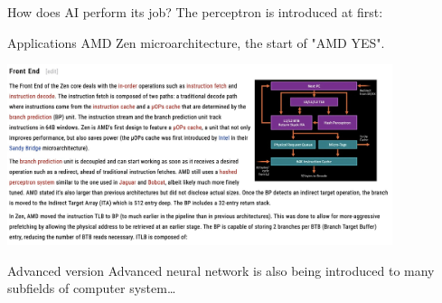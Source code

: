 \documentclass[UTF8]{ctexbeamer}
\begin{document}
\begin{frame}{How does AI perform its job?}
  The perceptron is introduced at first:
  \begin{center} 
  \end{center}
\end{frame}

\begin{frame}{Applications}
  AMD Zen microarchitecture, the start of "AMD YES".
  \begin{center}
    \includegraphics[height=150pt]{figure/amd_zen_bp.jpg}
  \end{center}
\end{frame}

\begin{frame}{Advanced version}
  Advanced neural network is also being introduced to many subfields of computer system\dots
\end{frame}
\end{document}
